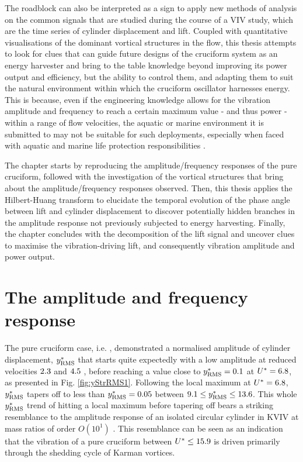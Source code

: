 \documentclass[oneside]{utmthesis}
\begin{document}
The roadblock can also be interpreted as a sign to apply new methods of analysis on the common signals that are studied during the course of a VIV study, which are the time series of cylinder displacement and lift. Coupled with quantitative visualisations of the dominant vortical structures in the flow, this thesis attempts to look for clues that can guide future designs of the cruciform system as an energy harvester and bring to the table knowledge beyond improving its power output and efficiency, but the ability to control them, and adapting them to suit the natural environment within which the cruciform oscillator harnesses energy. This is because, even if the engineering knowledge allows for the vibration amplitude and frequency to reach a certain maximum value - and thus power - within a range of flow velocities, the aquatic or marine environment it is submitted to may not be suitable for such deployments, especially when faced with aquatic and marine life protection responsibilities \citep{Raghavan2007}.

The chapter starts by reproducing the amplitude/frequency responses of the pure cruciform, followed with the investigation of the vortical structures that bring about the amplitude/frequency responses observed. Then, this thesis applies the Hilbert-Huang transform to elucidate the temporal evolution of the phase angle between lift and cylinder displacement to discover potentially hidden branches in the amplitude response not previously subjected to energy harvesting. Finally, the chapter concludes with the decomposition of the lift signal and uncover clues to maximise the vibration-driving lift, and consequently vibration amplitude and power output.

\section{The amplitude and frequency response}\label{sec:svivRegimeAmpFreqResp}

The pure cruciform case, i.e. \angfi{}, demonstrated a normalised \rms{} amplitude of cylinder displacement, $y^{*}_{\text{RMS}}$ that starts quite expectedly with a low amplitude at reduced velocities $2.3$ and $4.5$ , before reaching a value close to $y^{*}_{\text{RMS}} = 0.1$ at $U^{*} = 6.8$, as presented in Fig. \ref{fig:yStrRMS1}. Following the local maximum at $U^{*} = 6.8$, $y^{*}_{\text{RMS}}$ tapers off to less than $y^{*}_{\text{RMS}} = 0.05$ between $9.1 \leq y^{*}_{\text{RMS}} \leq 13.6$. This whole $y^{*}_{\text{RMS}}$ trend of hitting a local maximum before tapering off bears a striking resemblance to the amplitude response of an isolated circular cylinder in KVIV at mass ratios of order $O(10^{1})$ \citep{Feng1963,Khalak1999}. This resemblance can be seen as an indication that the vibration of a pure cruciform between $U^{*} \leq 15.9$ is driven primarily through the shedding cycle of Karman vortices.
\end{document}
